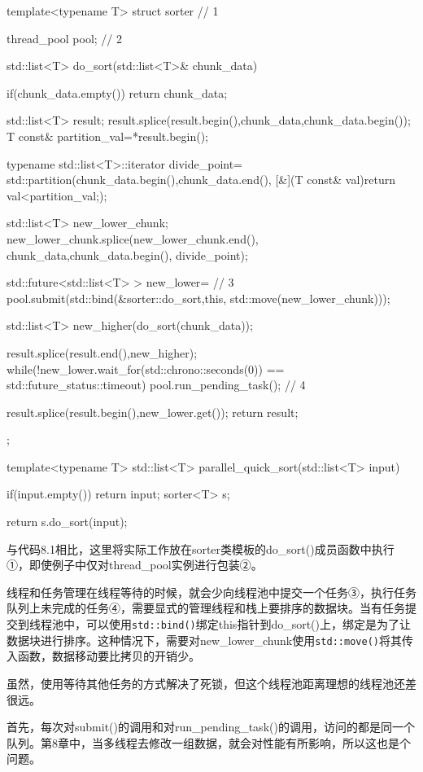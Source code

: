 \begin{cpp}
template<typename T>
struct sorter  // 1
{
  thread_pool pool;  // 2

  std::list<T> do_sort(std::list<T>& chunk_data)
  {
    if(chunk_data.empty())
    {
      return chunk_data;
    }

    std::list<T> result;
    result.splice(result.begin(),chunk_data,chunk_data.begin());
    T const& partition_val=*result.begin();

    typename std::list<T>::iterator divide_point=
      std::partition(chunk_data.begin(),chunk_data.end(),
                     [&](T const& val){return val<partition_val;});

    std::list<T> new_lower_chunk;
    new_lower_chunk.splice(new_lower_chunk.end(),
                           chunk_data,chunk_data.begin(),
                           divide_point);

    std::future<std::list<T> > new_lower=  // 3
      pool.submit(std::bind(&sorter::do_sort,this,
                            std::move(new_lower_chunk)));

    std::list<T> new_higher(do_sort(chunk_data));

    result.splice(result.end(),new_higher);
    while(!new_lower.wait_for(std::chrono::seconds(0)) ==
      std::future_status::timeout)
    {
      pool.run_pending_task();  // 4
    }

    result.splice(result.begin(),new_lower.get());
    return result;
  }
};

template<typename T>
std::list<T> parallel_quick_sort(std::list<T> input)
{
  if(input.empty())
  {
    return input;
  }
  sorter<T> s;

  return s.do_sort(input);
}
\end{cpp}

与代码8.1相比，这里将实际工作放在sorter类模板的do\_sort()成员函数中执行①，即使例子中仅对thread\_pool实例进行包装②。

线程和任务管理在线程等待的时候，就会少向线程池中提交一个任务③，执行任务队列上未完成的任务④，需要显式的管理线程和栈上要排序的数据块。当有任务提交到线程池中，可以使用\texttt{std::bind()}绑定this指针到do\_sort()上，绑定是为了让数据块进行排序。这种情况下，需要对new\_lower\_chunk使用\texttt{std::move()}将其传入函数，数据移动要比拷贝的开销少。

虽然，使用等待其他任务的方式解决了死锁，但这个线程池距离理想的线程池还差很远。

首先，每次对submit()的调用和对run\_pending\_task()的调用，访问的都是同一个队列。第8章中，当多线程去修改一组数据，就会对性能有所影响，所以这也是个问题。

